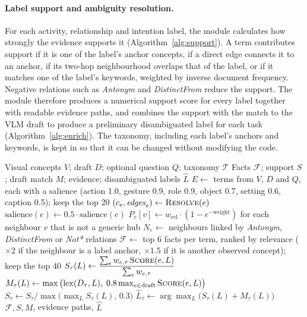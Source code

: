 \documentclass[12pt,a4paper,oneside]{report}
\begin{document}
\paragraph{Label support and ambiguity resolution.} For each activity,
relationship and intention label, the module calculates how strongly the
evidence supports it (Algorithm~\ref{alg:support}). A term contributes support
if it is one of the label's anchor concepts, if a direct edge connects it to an
anchor, if its two-hop neighbourhood overlaps that of the label, or if it
matches one of the label's keywords, weighted by inverse document frequency.
Negative relations such as \emph{Antonym} and \emph{DistinctFrom} reduce the
support. The module therefore produces a numerical support score for every label
together with readable evidence paths, and combines the support with the match
to the VLM draft to produce a preliminary disambiguated label for each task
(Algorithm~\ref{alg:enrich}). The taxonomy, including each label's anchors and
keywords, is kept in  so that it can be changed
without modifying the code.

\begin{algorithm}[htbp]
\caption{ConceptNet commonsense enrichment}
\label{alg:enrich}
\begin{algorithmic}[1]
\Require Visual concepts $V$; draft $D$; optional question $Q$; taxonomy $\mathcal{T}$
\Ensure Facts $\mathcal{F}$; support $S$; draft match $M$; evidence; disambiguated labels $\hat{L}$
\State $E \gets$ terms from $V$, $D$ and $Q$, each with a salience (action 1.0, gesture 0.9, role 0.9, object 0.7, setting 0.6, caption 0.5); keep the top 20
  \State $(c_e, \mathit{edges}_e) \gets \textsc{Resolve}(e)$ 
    \State $\mathrm{salience}(e) \gets 0.5 \cdot \mathrm{salience}(e)$ 
  \EndIf
  \State $P_e[v] \gets w_{\text{rel}} \cdot (1 - e^{-\text{weight}})$ for each neighbour $v$ that is not a generic hub
  \State $N_e \gets$ neighbours linked by \emph{Antonym}, \emph{DistinctFrom} or \emph{Not*} relations
\EndFor
\State $\mathcal{F} \gets$ top 6 facts per term, ranked by relevance ($\times 2$ if the neighbour is a label anchor, $\times 1.5$ if it is another observed concept); keep the top 40
    \State $S_\tau(L) \gets \dfrac{\sum_e w_{e,\tau}\, \textsc{Score}(e, L)}{\sum_e w_{e,\tau}}$ 
    \State $M_\tau(L) \gets \max\big(\mathrm{lex}(D_\tau, L),\; 0.8 \max_{e \in \text{draft}} \textsc{Score}(e, L)\big)$
  \EndFor
  \State $S_\tau \gets S_\tau / \max\big(\max_L S_\tau(L),\, 0.3\big)$
  \State $\hat{L}_\tau \gets \arg\max_L \big(S_\tau(L) + M_\tau(L)\big)$
\EndFor
\State \Return $\mathcal{F}, S, M$, evidence paths, $\hat{L}$
\end{algorithmic}
\end{algorithm}
\end{document}
